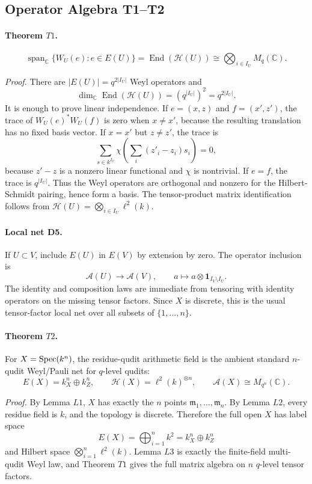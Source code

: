 \subsection{Operator Algebra T1--T2}

\paragraph{Theorem \(T1\).}
\[
  \operatorname{span}_{\mathbb C}\{W_U(e):e\in E(U)\}
  =
  \operatorname{End}(\mathcal H(U))
  \cong
  \bigotimes_{i\in I_U}M_q(\mathbb C).
\]

\emph{Proof.}
There are \(|E(U)|=q^{2|I_U|}\) Weyl operators and
\[
  \dim_\mathbb C\operatorname{End}(\mathcal H(U))
  =
  (q^{|I_U|})^2
  =
  q^{2|I_U|}.
\]
It is enough to prove linear independence.  If \(e=(x,z)\) and
\(f=(x',z')\), the trace of \(W_U(e)^*W_U(f)\) is zero when \(x\ne x'\),
because the resulting translation has no fixed basis vector.  If \(x=x'\) but
\(z\ne z'\), the trace is
\[
  \sum_{s\in k^{I_U}}\chi\!\left(\sum_i(z'_i-z_i)s_i\right)=0,
\]
because \(z'-z\) is a nonzero linear functional and \(\chi\) is nontrivial.
If \(e=f\), the trace is \(q^{|I_U|}\).  Thus the Weyl operators are
orthogonal and nonzero for the Hilbert-Schmidt pairing, hence form a basis.
The tensor-product matrix identification follows from
\(\mathcal H(U)=\bigotimes_{i\in I_U}\ell^2(k)\).

\paragraph{Local net D5.}
If \(U\subset V\), include \(E(U)\) in \(E(V)\) by extension by zero.  The
operator inclusion is
\[
  \mathcal A(U)\longrightarrow\mathcal A(V),
  \qquad
  a\longmapsto a\otimes\mathbf 1_{I_V\setminus I_U}.
\]
The identity and composition laws are immediate from tensoring with identity
operators on the missing tensor factors.  Since \(X\) is discrete, this is the
usual tensor-factor local net over all subsets of \(\{1,\ldots,n\}\).

\paragraph{Theorem \(T2\).}
For \(X=\operatorname{Spec}(k^n)\), the residue-qudit arithmetic field is the ambient
standard \(n\)-qudit Weyl/Pauli net for \(q\)-level qudits:
\[
  E(X)=k^n_X\oplus k^n_Z,\qquad
  \mathcal H(X)=\ell^2(k)^{\otimes n},\qquad
  \mathcal A(X)\cong M_{q^n}(\mathbb C).
\]

\emph{Proof.}
By Lemma \(L1\), \(X\) has exactly the \(n\) points
\(\mathfrak m_1,\ldots,\mathfrak m_n\).  By Lemma \(L2\), every residue field
is \(k\), and the topology is discrete.  Therefore the full open \(X\) has
label space
\[
  E(X)=\bigoplus_{i=1}^nk^2=k^n_X\oplus k^n_Z
\]
and Hilbert space \(\bigotimes_{i=1}^n\ell^2(k)\).  Lemma \(L3\) is exactly
the finite-field multi-qudit Weyl law, and Theorem \(T1\) gives the full
matrix algebra on \(n\) \(q\)-level tensor factors.

